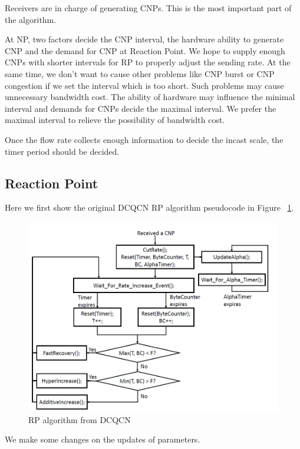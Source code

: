 \documentclass[12pt,a4paper]{article}
\begin{document}
Receivers are in charge of generating CNPs.
This is the most important part of the algorithm.

At NP, two factors decide the CNP interval, the hardware ability to generate CNP and the demand for CNP at Reaction Point.
We hope to supply enough CNPs with shorter intervals for RP to properly adjust the sending rate.
At the same time, we don't want to cause other problems like CNP burst or CNP congestion if we set the interval which is too short.
Such problems may cause unnecessary bandwidth cost.
The ability of hardware may influence the minimal interval and demands for CNPs decide the maximal interval.
We prefer the maximal interval to relieve the possibility of bandwidth cost.

Once the flow rate collects enough information to decide the incast scale, the timer period should be decided.

\subsection{Reaction Point}

Here we first show the original DCQCN RP algorithm pseudocode in Figure ~\ref{fig:RPalg}.
\begin{figure}[h!]
	\begin{center}
		\includegraphics[width=6in]{RPalg}
		\caption{RP algorithm from DCQCN}
		\label{fig:RPalg}
	\end{center}
\end{figure}

We make some changes on the updates of parameters.
\end{document}
